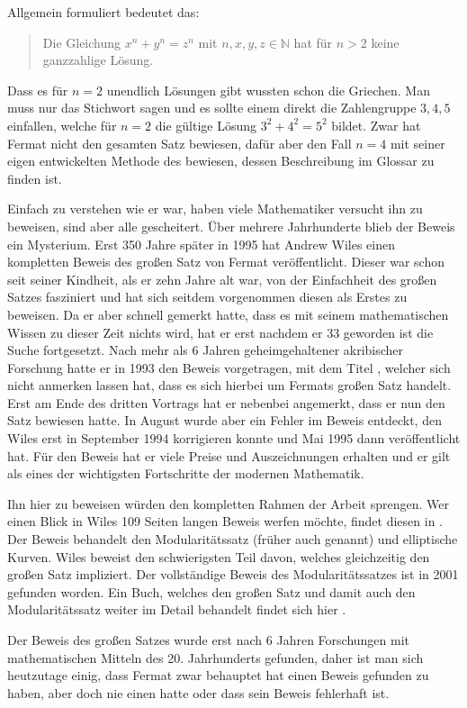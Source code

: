         Allgemein formuliert bedeutet das:
        \begin{quote}
            Die Gleichung $x^n + y^n = z^n$ mit $n,x,y,z \in \mathbb{N}$ hat für $n>2$ keine ganzzahlige Lösung.
        \end{quote}
        
        Dass es für $n = 2$ unendlich Lösungen gibt wussten schon die Griechen. Man muss nur das Stichwort  sagen und es sollte einem direkt die Zahlengruppe $3,4,5$ einfallen, welche für $n = 2$ die gültige Lösung $3^2 + 4^2 = 5^2$ bildet. Zwar hat Fermat nicht den gesamten Satz bewiesen, dafür aber den Fall $n = 4$ mit seiner eigen entwickelten Methode des  bewiesen, dessen Beschreibung im Glossar zu finden ist. 
        
        Einfach zu verstehen wie er war, haben viele Mathematiker versucht ihn zu beweisen, sind aber alle gescheitert. Über mehrere Jahrhunderte blieb der Beweis ein Mysterium. Erst 350 Jahre später in 1995 hat Andrew Wiles einen kompletten Beweis des großen Satz von Fermat veröffentlicht.  Dieser war schon seit seiner Kindheit, als er zehn Jahre alt war, von der Einfachheit des großen Satzes fasziniert und hat sich seitdem vorgenommen diesen als Erstes zu beweisen. Da er aber schnell gemerkt hatte, dass es mit seinem mathematischen Wissen zu dieser Zeit nichts wird, hat er erst nachdem er 33 geworden ist die Suche fortgesetzt. Nach mehr als 6 Jahren geheimgehaltener akribischer Forschung hatte er in 1993 den Beweis vorgetragen, mit dem Titel , welcher sich nicht anmerken lassen hat, dass es sich hierbei um Fermats großen Satz handelt. Erst am Ende des dritten Vortrags hat er nebenbei angemerkt, dass er nun den Satz bewiesen hatte. \cite{newYorkTimes} In August wurde aber ein Fehler im Beweis entdeckt, den Wiles erst in September 1994 korrigieren konnte und Mai 1995 dann veröffentlicht hat. Für den Beweis hat er viele Preise und Auszeichnungen erhalten und er gilt als eines der wichtigsten Fortschritte der modernen Mathematik. 
        
        Ihn hier zu beweisen würden den kompletten Rahmen der Arbeit sprengen. Wer einen Blick in Wiles 109 Seiten langen Beweis werfen möchte, findet diesen in \cite{wilesFermat}. Der Beweis behandelt den Modularitätssatz (früher auch  genannt) und elliptische Kurven. Wiles beweist den schwierigsten Teil davon, welches gleichzeitig den großen Satz impliziert. Der vollständige Beweis des Modularitätssatzes ist in 2001 gefunden worden. Ein Buch, welches den großen Satz und damit auch den Modularitätssatz weiter im Detail behandelt findet sich hier \cite{darmon}. 
        
        Der Beweis des großen Satzes wurde erst nach 6 Jahren Forschungen mit mathematischen Mitteln des 20. Jahrhunderts gefunden, daher ist man sich heutzutage einig, dass Fermat zwar behauptet hat einen Beweis gefunden zu haben, aber doch nie einen hatte oder dass sein Beweis fehlerhaft ist. 
